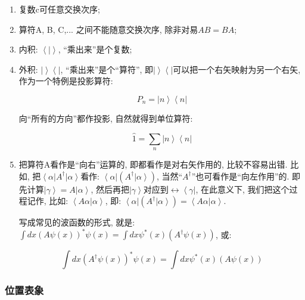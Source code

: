\begin{enumerate}
  \item 复数c可任意交换次序;
  \item 算符A, B, C,... 之间不能随意交换次序, 除非对易$AB = BA$;
  \item 内积: $\left\langle | \right\rangle$, ``乘出来''是个复数;
  \item 外积: $\left|  \right\rangle \left\langle  \right|$,
  ``乘出来''是个``算符'', 即$\left|  \right\rangle \left\langle
  \right|$可以把一个右矢映射为另一个右矢, 作为一个特例是投影算符:

\begin{equation*}
P_n = \left| n \right\rangle \left\langle n \right|
\end{equation*}

向``所有的方向''都作投影, 自然就得到单位算符:

\begin{equation*}
\hat 1 = \sum\limits_{n} \left| n \right\rangle \left\langle n
\right|
\end{equation*}

\item 把算符A看作是``向右''运算的, 即都看作是对右矢作用的,  比较不容易出错. 比如, 把$\left\langle \alpha \right| A^{\dagger} \left| \alpha \right\rangle
  $看作: $\left\langle \alpha \right| \left( A^{\dagger} \left| \alpha
  \right\rangle \right)$,
  当然``$A^{\dagger}$''也可看作是``向左作用''的. 即先计算$\left| \gamma \right\rangle = A \left| \alpha
  \right\rangle$, 然后再把$\left| \gamma \right\rangle$对应到$\leftrightarrow \left\langle \gamma \right|$, 在此意义下, 我们把这个过程记作, 比如:
  $\left\langle A \alpha | \alpha \right\rangle$, 即: $\left\langle \alpha \right| \left( A^{\dagger} \left| \alpha
  \right\rangle \right) = \left\langle A \alpha | \alpha \right\rangle$.

  写成常见的波函数的形式, 就是: $\int dx (A\psi(x))^* \psi(x) = \int dx \psi^*(x) (A^{\dagger}
  \psi(x))$, 或:

\begin{equation*}
\int dx (A^{\dagger} \psi(x))^* \psi(x) = \int dx \psi^*(x) (A
\psi(x))
\end{equation*}

\end{enumerate}


\subsubsection{位置表象}

